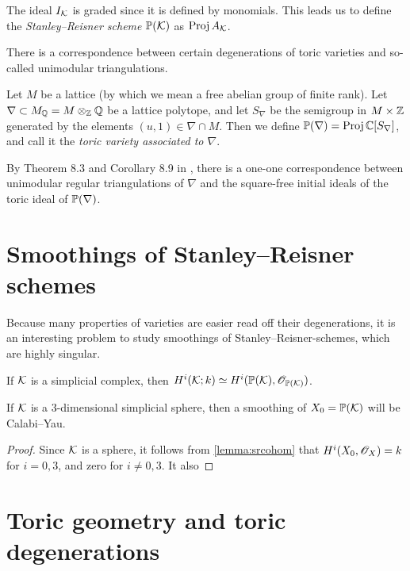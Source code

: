 The ideal $I_\K$ is graded since it is defined by monomials. This leads us to define the \emph{Stanley--Reisner scheme} $\P(\K)$ as $\Proj A_\K$. 

There is a correspondence between certain degenerations of toric varieties and so-called unimodular triangulations. 

Let $M$ be a lattice (by which we mean a free abelian group of finite rank). Let $\nabla \subset M_\Q = M \otimes_\Z \Q$ be a lattice polytope, and let $S_\nabla$ be the semigroup in $M \times \Z$ generated by the elements $(u,1) \in \nabla \cap M$. Then we define $\P(\nabla)=\Proj \C[S_\nabla]$, and call it the \emph{toric variety associated to $\nabla$}. 

By Theorem 8.3 and Corollary 8.9 in \cite{sturmfels}, there is a one-one correspondence between unimodular regular triangulations of $\nabla$ and the square-free initial ideals of the toric ideal of $\P(\nabla)$. 


\section{Smoothings of Stanley--Reisner schemes}

Because many properties of varieties are easier read off their degenerations, it is an interesting problem to study smoothings of Stanley--Reisner-schemes, which are highly singular.

\begin{lemma}
\label{lemma:srcohom}
If $\K$ is a simplicial complex, then $H^i(\K;k) \simeq H^i(\P(\K),\OO_{\P(\K)})$.
\end{lemma}

\begin{lemma}
If $\K$ is a 3-dimensional simplicial sphere, then a smoothing of $X_0=\P(\K)$ will be Calabi--Yau.
\end{lemma}
\begin{proof}
Since $\K$ is a sphere, it follows from \ref{lemma:srcohom} that $H^i(X_0,\OO_X)=k$ for $i=0,3$, and zero for $i \neq 0,3$. It also 
\end{proof}


\section{Toric geometry and toric degenerations}
\label{sec:toricgeometry}

